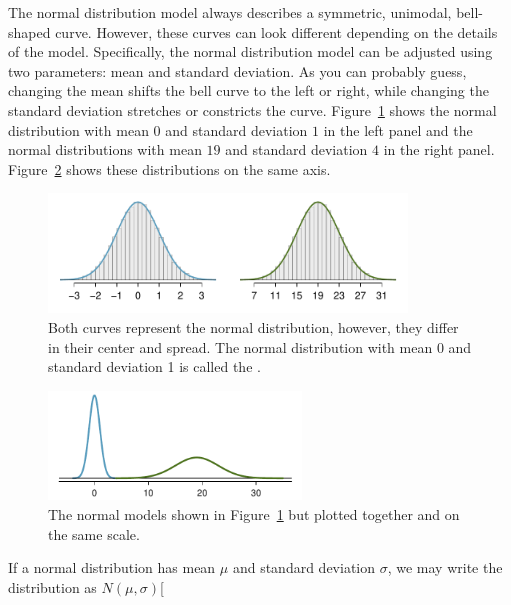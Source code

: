 The normal distribution model always describes a symmetric, unimodal, bell-shaped curve. However, these curves can look different depending on the details of the model. Specifically, the normal distribution model can be adjusted using two parameters: mean and standard deviation. As you can probably guess, changing the mean shifts the bell curve to the left or right, while changing the standard deviation stretches or constricts the curve. Figure~\ref{twoSampleNormals} shows the normal distribution with mean $0$ and standard deviation $1$ in the left panel and the normal distributions with mean $19$ and standard deviation $4$ in the right panel. Figure~\ref{twoSampleNormalsStacked} shows these distributions on the same axis.

\begin{figure}[hht]
\centering
\includegraphics[width=0.85\textwidth]{ch_distributions/figures/twoSampleNormals/twoSampleNormals}
\caption{Both curves represent the normal distribution, however, they differ in their center and spread. The normal distribution with mean 0 and standard deviation 1 is called the .}
\label{twoSampleNormals}
\end{figure}

\begin{figure}[hht]
\centering
\includegraphics[width=0.6\textwidth]{ch_distributions/figures/twoSampleNormalsStacked/twoSampleNormalsStacked}
\caption{The normal models shown in Figure~\ref{twoSampleNormals} but plotted together and on the same scale.}
\label{twoSampleNormalsStacked}
\end{figure}

If a normal distribution has mean $\mu$ and standard deviation $\sigma$, we may write the distribution as $N(\mu, \sigma)$\marginpar[\raggedright\vspace{-5mm}


